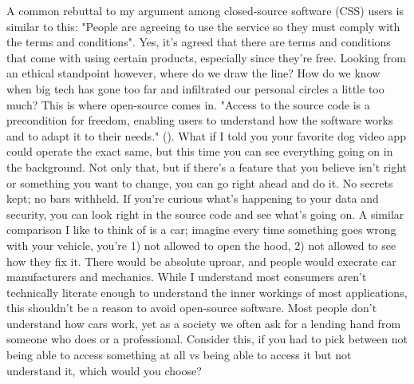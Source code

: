 \documentclass[11pt]{article}
\begin{document}
A common rebuttal to my argument among closed-source software (CSS) users is similar to this: "People are agreeing to use the service so they must comply with the terms and conditions". Yes, it's agreed that there are terms and conditions that come with using certain products, especially since they're free. Looking from an ethical standpoint however, where do we draw the line? How do we know when big tech has gone too far and infiltrated our personal circles a little too much? This is where open-source comes in. "Access to the source code is a precondition for freedom, enabling users to understand how the software works and to adapt it to their needs." (\cite{WhatIsFreeSoftware}). What if I told you your favorite dog video app could operate the exact same, but this time you can see everything going on in the background. Not only that, but if there's a feature that you believe isn't right or something you want to change, you can go right ahead and do it. No secrets kept; no bars withheld. If you're curious what's happening to your data and security, you can look right in the source code and see what's going on. A similar comparison I like to think of is a car; imagine every time something goes wrong with your vehicle, you're 1) not allowed to open the hood, 2) not allowed to see how they fix it. There would be absolute uproar, and people would execrate car manufacturers and mechanics. While I understand most consumers aren't technically literate enough to understand the inner workings of most applications, this shouldn't be a reason to avoid open-source software. Most people don't understand how cars work, yet as a society we often ask for a lending hand from someone who does or a professional. Consider this, if you had to pick between not being able to access something at all vs being able to access it but not understand it, which would you choose?
\end{document}
